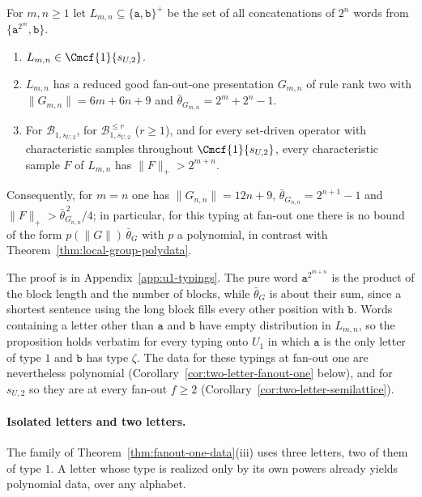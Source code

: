\begin{proposition}
\label{prop:binary-u1-quadratic}
For $m,n\ge1$ let $L_{m,n}\subseteq\{\mathtt a,\mathtt b\}^+$ be the set of all
concatenations of $2^n$ words from $\{\mathtt a^{2^m},\mathtt b\}$.
\begin{enumerate}[label=\textup{(\roman*)},leftmargin=*]
\item $L_{m,n}\in\Cmcf{1}{s_{U,2}}$.
\item $L_{m,n}$ has a reduced good fan-out-one presentation $G_{m,n}$ of rule rank
two with $\|G_{m,n}\|=6m+6n+9$ and $\bar\theta_{G_{m,n}}=2^m+2^n-1$.
\item For $\mathcal B_{1,s_{U,2}}$, for $\mathcal B^{\le r}_{1,s_{U,2}}$ \textup($r\ge1$\textup),
and for every set-driven operator with characteristic samples throughout
$\Cmcf{1}{s_{U,2}}$, every characteristic sample $F$ of $L_{m,n}$ has
$\|F\|_+>2^{m+n}$.
\end{enumerate}
Consequently, for $m=n$ one has $\|G_{n,n}\|=12n+9$, $\bar\theta_{G_{n,n}}=2^{n+1}-1$
and $\|F\|_+>\bar\theta_{G_{n,n}}^{\,2}/4$; in particular, for this typing at
fan-out one there is no bound of the form $p(\|G\|)\,\bar\theta_G$ with $p$ a
polynomial, in contrast with Theorem~\ref{thm:local-group-polydata}.
\end{proposition}

The proof is in Appendix~\ref{app:u1-typings}.  The pure word
$\mathtt a^{2^{m+n}}$ is the product of the block length and the number of
blocks, while $\bar\theta_G$ is about their sum, since a shortest sentence using
the long block fills every other position with $\mathtt b$.  Words containing a
letter other than $\mathtt a$ and $\mathtt b$ have empty distribution in
$L_{m,n}$, so the proposition holds verbatim for every typing onto $U_1$ in
which $\mathtt a$ is the only letter of type $1$ and $\mathtt b$ has type $\zeta$.
The data for these typings at fan-out one are nevertheless polynomial
(Corollary~\ref{cor:two-letter-fanout-one} below), and for $s_{U,2}$ so they are
at every fan-out $f\ge2$ (Corollary~\ref{cor:two-letter-semilattice}).

\paragraph{Isolated letters and two letters.}
The family of Theorem~\ref{thm:fanout-one-data}(iii) uses three letters, two of
them of type $1$.  A letter whose type is realized only by its own powers
already yields polynomial data, over any alphabet.

